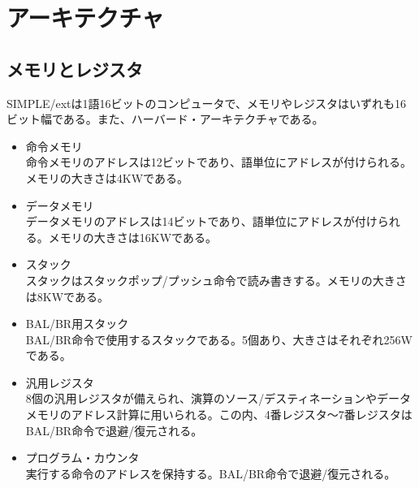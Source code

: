\documentclass{jarticle}
\begin{document}
\section{アーキテクチャ}
\subsection{メモリとレジスタ}
\hspace{10pt}SIMPLE/extは1語16ビットのコンピュータで、メモリやレジスタはいずれも16ビット幅である。また、ハーバード・アーキテクチャである。
\begin{itemize}
\item 命令メモリ　\\
命令メモリのアドレスは12ビットであり、語単位にアドレスが付けられる。メモリの大きさは4KWである。
\item データメモリ \\
データメモリのアドレスは14ビットであり、語単位にアドレスが付けられる。メモリの大きさは16KWである。
\item スタック \\
スタックはスタックポップ/プッシュ命令で読み書きする。メモリの大きさは8KWである。
\item BAL/BR用スタック \\
BAL/BR命令で使用するスタックである。5個あり、大きさはそれぞれ256Wである。
\item 汎用レジスタ \\
8個の汎用レジスタが備えられ、演算のソース/デスティネーションやデータメモリのアドレス計算に用いられる。この内、4番レジスタ～7番レジスタはBAL/BR命令で退避/復元される。
\item プログラム・カウンタ \\
実行する命令のアドレスを保持する。BAL/BR命令で退避/復元される。
\end{itemize}
\end{document}
